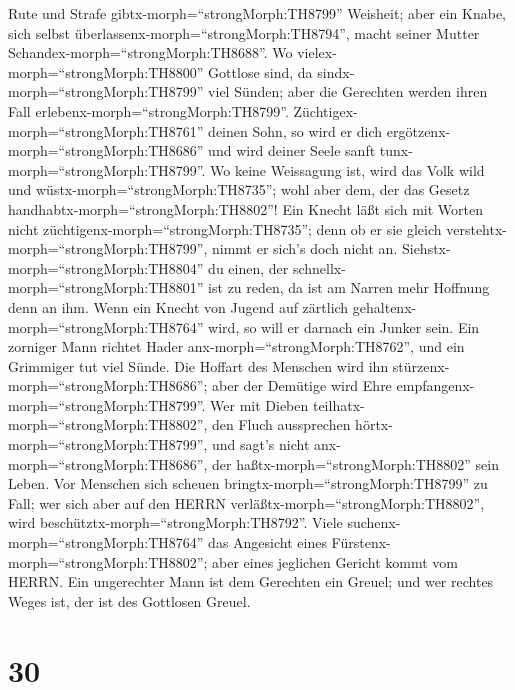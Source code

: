 Rute und Strafe gibtx-morph=``strongMorph:TH8799'' Weisheit; aber ein
Knabe, sich selbst überlassenx-morph=``strongMorph:TH8794'', macht
seiner Mutter Schandex-morph=``strongMorph:TH8688''.  Wo
vielex-morph=``strongMorph:TH8800'' Gottlose sind, da
sindx-morph=``strongMorph:TH8799'' viel Sünden; aber die Gerechten
werden ihren Fall erlebenx-morph=``strongMorph:TH8799''. 
Züchtigex-morph=``strongMorph:TH8761'' deinen Sohn, so wird er dich
ergötzenx-morph=``strongMorph:TH8686'' und wird deiner Seele sanft
tunx-morph=``strongMorph:TH8799''.  Wo keine Weissagung
ist, wird das Volk wild und wüstx-morph=``strongMorph:TH8735''; wohl
aber dem, der das Gesetz handhabtx-morph=``strongMorph:TH8802''!
 Ein Knecht läßt sich mit Worten nicht
züchtigenx-morph=``strongMorph:TH8735''; denn ob er sie gleich
verstehtx-morph=``strongMorph:TH8799'', nimmt er sich's doch nicht an.
 Siehstx-morph=``strongMorph:TH8804'' du einen, der
schnellx-morph=``strongMorph:TH8801'' ist zu reden, da ist am Narren
mehr Hoffnung denn an ihm.  Wenn ein Knecht von Jugend auf
zärtlich gehaltenx-morph=``strongMorph:TH8764'' wird, so will er darnach
ein Junker sein.  Ein zorniger Mann richtet Hader
anx-morph=``strongMorph:TH8762'', und ein Grimmiger tut viel Sünde.
 Die Hoffart des Menschen wird ihn
stürzenx-morph=``strongMorph:TH8686''; aber der Demütige wird Ehre
empfangenx-morph=``strongMorph:TH8799''.  Wer mit Dieben
teilhatx-morph=``strongMorph:TH8802'', den Fluch aussprechen
hörtx-morph=``strongMorph:TH8799'', und sagt's nicht
anx-morph=``strongMorph:TH8686'', der haßtx-morph=``strongMorph:TH8802''
sein Leben.  Vor Menschen sich scheuen
bringtx-morph=``strongMorph:TH8799'' zu Fall; wer sich aber auf den
HERRN verläßtx-morph=``strongMorph:TH8802'', wird
beschütztx-morph=``strongMorph:TH8792''.  Viele
suchenx-morph=``strongMorph:TH8764'' das Angesicht eines
Fürstenx-morph=``strongMorph:TH8802''; aber eines jeglichen Gericht
kommt vom HERRN.  Ein ungerechter Mann ist dem Gerechten
ein Greuel; und wer rechtes Weges ist, der ist des Gottlosen Greuel.

\hypertarget{section-29}{%
\section{30}\label{section-29}}

